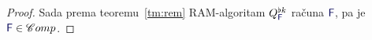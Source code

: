 \begin{proof}
%

    Sada prema teoremu~\ref{tm:rem} RAM-algoritam $Q_{\f F}^{\flat k}$ računa $\f F$, pa je $\f F\in\mathscr Comp$.
\end{proof}

